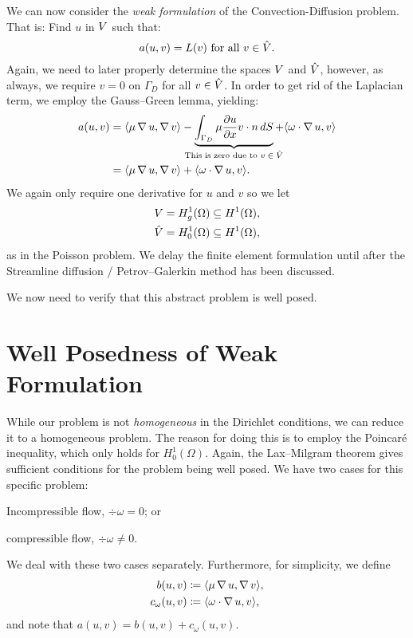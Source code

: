 We can now consider the \emph{weak formulation} of the Convection-Diffusion
problem. That is: Find \( u \) in \( V \) such that:
\begin{equation}
    a(u, v) = L(v) \text{ for all } v \in \hat{V}.
\end{equation}
Again, we need to later properly determine the spaces \( V \) and \( \hat{V}
\), however, as always, we require \( v = 0 \) on \( \Gamma_D \) for all \( v
\in \hat{V} \).  In order to get rid of the Laplacian term, we employ the
Gauss--Green lemma, yielding:
\begin{align}
a(u, v) &= \langle \mu \grad u, \grad v \rangle - \underbrace{\int_{\Gamma_D}
\mu \frac{\partial u}{\partial x} v \cdot n \, dS}_{\mathclap{\text{This is zero due to
\( v \in \test\)}}} + \langle \omega \cdot \grad u, v \rangle \\
&= \langle \mu \grad u, \grad v \rangle +  \langle \omega \cdot \grad u, v \rangle.
\end{align}
We again only require one derivative for \( u \) and \( v \) so we let
\begin{align}
    V = H^1_g(\Omega) \subseteq H^1(\Omega), \\
    \hat{V} = H^1_0(\Omega) \subseteq H^1(\Omega),
\end{align}
as in the Poisson problem. We delay the finite element formulation until after
the Streamline diffusion / Petrov--Galerkin method has been discussed.

We now need to verify that this abstract problem is well posed.

\section{Well Posedness of Weak Formulation}

While our problem is not \emph{homogeneous} in the Dirichlet conditions, we can
reduce it to a homogeneous problem. The reason for doing this is to employ the
Poincar\'e inequality, which only holds for \( H^1_0 (\Omega) \). Again, the
Lax--Milgram theorem gives sufficient conditions for the problem being well
posed. We have two cases for this specific problem:
\begin{inparaenum}[(i)]
    \item Incompressible flow, \( \div \omega = 0\); or
    \item compressible flow, \( \div \omega \neq 0\).
\end{inparaenum}
We deal with these two cases separately.
Furthermore, for simplicity, we define
\begin{align}
    b(u, v) &\coloneqq \langle \mu \operatorname{\mathop{}\!\nabla} u, \operatorname{\mathop{}\!\nabla} v \rangle,\\
    c_\omega(u, v) &\coloneqq \langle \omega \cdot \operatorname{\mathop{}\!\nabla} u, v \rangle,
\end{align}
and note that \(a(u, v) = b(u, v) + c_\omega(u, v)\).

